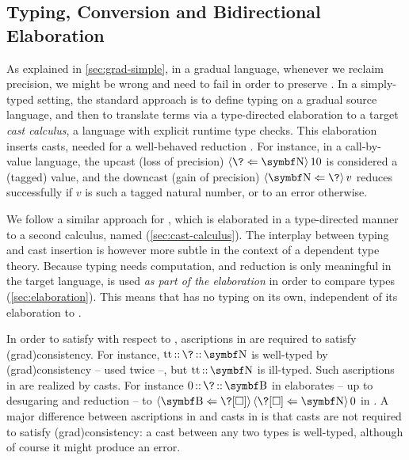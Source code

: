 \subsection{Typing, Conversion and Bidirectional Elaboration}

As explained in \cref{sec:grad-simple},
in a gradual language, whenever we reclaim precision, we might be wrong and need to fail in order to preserve .
%
In a simply-typed setting, the standard approach is to define typing on a
gradual source language, and then to translate terms via a type-directed elaboration
to a target \emph{cast calculus}, \ie a language with explicit runtime type
checks.
This elaboration inserts casts, needed for a well-behaved reduction .
For instance, in a call-by-value language, the upcast (loss of precision)
$\castrev{10}{\Nat}{\?}$ is considered a (tagged) value,
and the downcast (gain of precision) $\castrev{v}{\?}{\Nat}$ reduces successfully
if $v$ is such a tagged natural number, or to an error otherwise.

We follow a similar approach for , which is
elaborated in a type-directed manner to a second calculus,
named  (\cref{sec:cast-calculus}).
The interplay between typing and cast insertion is however more subtle in the
context of a dependent type theory. Because typing needs computation, and
reduction is only meaningful in the target language,  is used
\emph{as part of the elaboration} in order to compare types (\cref{sec:elaboration}).
This means that  has no typing on its own, independent of its
elaboration to .%

In order to satisfy  with respect to , ascriptions in 
are required to satisfy \kl(grad){consistency}. For instance, $\asc{\asc{\true}{\?}}{\Nat}$ is well-typed by \kl(grad){consistency} – used twice –, but $\asc{\true}{\Nat}$ is ill-typed.
Such ascriptions in  are realized by casts.
For instance $\asc{\asc{0}{\?}}{\Bool}$ in  elaborates
– up to desugaring and reduction – to
$\castrev{\castrev{0}{\Nat}{\?[\uni]}}{\?[\uni]}{\Bool}$ in .
A major difference between ascriptions in  and casts in  is
that casts are not required to satisfy \kl(grad){consistency}: a cast between any
two types is well-typed, although of course it might produce an
error.


